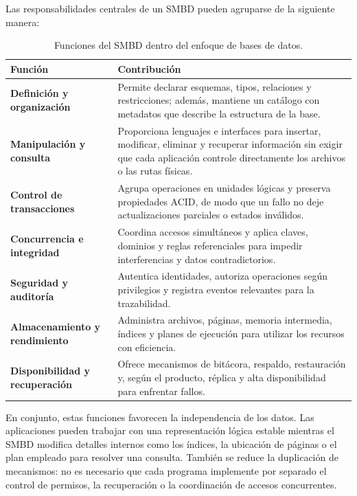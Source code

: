 Las responsabilidades centrales de un SMBD pueden agruparse de la siguiente
manera:

\begin{table}[H]
\centering
\caption{Funciones del SMBD dentro del enfoque de bases de datos.}
\label{tab:funciones-smdb}
\begin{tabularx}{\textwidth}{>{\raggedright\arraybackslash\bfseries}p{3.7cm} X}
\toprule
\rowcolor{unamblue}
\color{white}Función & \color{white}\textbf{Contribución} \\
\midrule
Definición y organización &
Permite declarar esquemas, tipos, relaciones y restricciones; además, mantiene
un catálogo con metadatos que describe la estructura de la base. \\
\rowcolor{softblue}
Manipulación y consulta &
Proporciona lenguajes e interfaces para insertar, modificar, eliminar y
recuperar información sin exigir que cada aplicación controle directamente los
archivos o las rutas físicas. \\
Control de transacciones &
Agrupa operaciones en unidades lógicas y preserva propiedades ACID, de modo que
un fallo no deje actualizaciones parciales o estados inválidos. \\
\rowcolor{softblue}
Concurrencia e integridad &
Coordina accesos simultáneos y aplica claves, dominios y reglas referenciales
para impedir interferencias y datos contradictorios. \\
Seguridad y auditoría &
Autentica identidades, autoriza operaciones según privilegios y registra
eventos relevantes para la trazabilidad. \\
\rowcolor{softblue}
Almacenamiento y rendimiento &
Administra archivos, páginas, memoria intermedia, índices y planes de ejecución
para utilizar los recursos con eficiencia. \\
Disponibilidad y recuperación &
Ofrece mecanismos de bitácora, respaldo, restauración y, según el producto,
réplica y alta disponibilidad para enfrentar fallos. \\
\bottomrule
\end{tabularx}
\end{table}

En conjunto, estas funciones favorecen la independencia de los datos. Las
aplicaciones pueden trabajar con una representación lógica estable mientras el
SMBD modifica detalles internos como los índices, la ubicación de páginas o el
plan empleado para resolver una consulta. También se reduce la duplicación de
mecanismos: no es necesario que cada programa implemente por separado el
control de permisos, la recuperación o la coordinación de accesos concurrentes.

